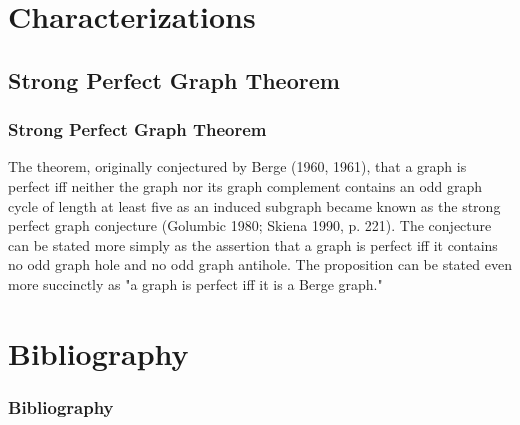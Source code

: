 \documentclass{beamer}
\begin{document}
\section{Characterizations}
\subsection{Strong Perfect Graph Theorem}
\begin{frame}\frametitle{Strong Perfect Graph Theorem}
\begin{block}{}
The theorem, originally conjectured by Berge (1960, 1961), that a graph is perfect iff neither the graph nor its graph complement contains an odd graph cycle of length at least five as an induced subgraph became known as the strong perfect graph conjecture (Golumbic 1980; Skiena 1990, p. 221). The conjecture can be stated more simply as the assertion that a graph is perfect iff it contains no odd graph hole and no odd graph antihole. The proposition can be stated even more succinctly as "a graph is perfect iff it is a Berge graph."
\end{block}
\end{frame}

\section{Bibliography}
\begin{frame}[allowframebreaks]
\frametitle{Bibliography}
    \tiny{ }
    
\end{frame}
\end{document}
